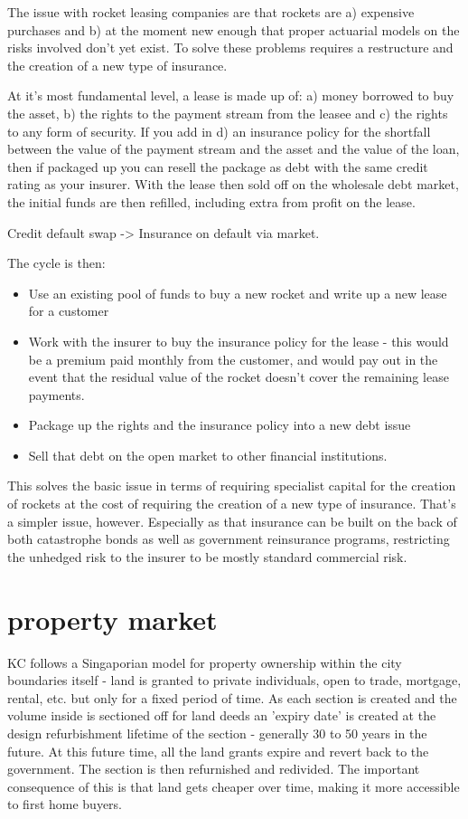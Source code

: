 \documentclass[10pt]{article}
\begin{document}
The issue with rocket leasing companies are that rockets are a) expensive purchases and b) at the moment new enough that proper actuarial models on the risks involved don't yet exist. To solve these problems requires a restructure and the creation of a new type of insurance.

At it's most fundamental level, a lease is made up of: a) money borrowed to buy the asset, b) the rights to the payment stream from the leasee and c) the rights to any form of security. If you add in d) an insurance policy for the shortfall between the value of the payment stream and the asset and the value of the loan, then if packaged up you can resell the package as debt with the same credit rating as your insurer. With the lease then sold off on the wholesale debt market, the initial funds are then refilled, including extra from profit on the lease. 

Credit default swap -> Insurance on default via market.

The cycle is then:
\begin{itemize}
    \item Use an existing pool of funds to buy a new rocket and write up a new lease for a customer
    \item Work with the insurer to buy the insurance policy for the lease - this would be a premium paid monthly from the customer, and would pay out in the event that the residual value of the rocket doesn't cover the remaining lease payments.
    \item Package up the rights and the insurance policy into a new debt issue
    \item Sell that debt on the open market to other financial institutions.
\end{itemize}

This solves the basic issue in terms of requiring specialist capital for the creation of rockets at the cost of requiring the creation of a new type of insurance. That's a simpler issue, however. Especially as that insurance can be built on the back of both catastrophe bonds as well as government reinsurance programs, restricting the unhedged risk to the insurer to be mostly standard commercial risk.

\section{property market}
KC follows a Singaporian model for property ownership within the city boundaries itself - land is granted to private individuals, open to trade, mortgage, rental, etc. but only for a fixed period of time. As each section is created and the volume inside is sectioned off for land deeds an 'expiry date' is created at the design refurbishment lifetime of the section - generally 30 to 50 years in the future. At this future time, all the land grants expire and revert back to the government. The section is then refurnished and redivided. The important consequence of this is that land gets cheaper over time, making it more accessible to first home buyers.
\end{document}

